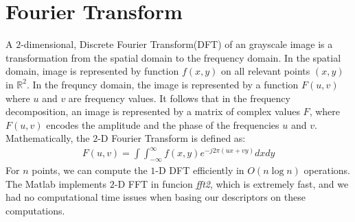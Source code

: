 \documentclass{report}
\begin{document}
\section{Fourier Transform} 
\label{sec:FFT} 
A $2$-dimensional, Discrete Fourier Transform(DFT) of an grayscale image is a transformation from the spatial domain to the frequency domain. In the spatial domain, image is represented by function $f(x,y)$ on all relevant points $(x,y)$ in  $\mathbb{R}^2$. In the frequncy domain, the image is represented by a function $F(u,v)$ where $u$ and $v$ are frequency values. It follows that in the frequency decomposition, an image is represented by a matrix of complex values $F$, where $F(u,v)$ encodes the amplitude and the phase of the frequencies $u$ and $v$. Mathematically, the $2$-D Fourier Transform is defined as:
\begin{eqnarray}
F(u,v) = \int \int ^{\infty}_{-\infty} f(x,y)e^{-j2\pi (ux+vy)}dx dy
\end{eqnarray}
For $n$ points, we can compute the $1$-D DFT efficiently in $O(n\log{n})$ operations. The Matlab implements $2$-D FFT  in funcion \textit{fft2}, which is extremely  fast, and we had no computational time issues when basing our descriptors on these computations.
\end{document}
